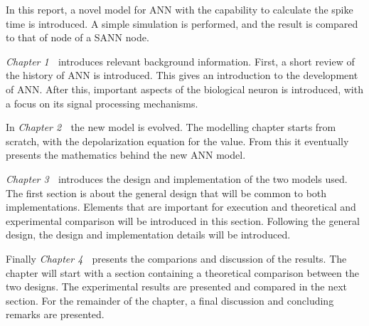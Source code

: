 In this report, a novel model for ANN with the capability to calculate the spike time is introduced.
A simple simulation is performed, and the result is compared to that of node of a SANN node.

\emph{Chapter 1} $\;$ introduces relevant background information. 
	First, a short review of the history of ANN is introduced. This gives an introduction to the development of ANN. After this, important aspects of the biological neuron is introduced, with a focus on its signal processing mechanisms.

In \emph{Chapter 2} $\;$ the new model is evolved. The modelling chapter starts from scratch, with the depolarization equation for the value. From this it eventually presents the mathematics behind the new ANN model.

\emph{Chapter 3} $\;$ introduces the design and implementation of the two models used. 
	The first section is about the general design that will be common to both implementations. Elements that are important for execution and  theoretical and experimental comparison will be introduced in this section.
	Following the general design, the design and implementation details will be introduced.

Finally \emph{Chapter 4} $\;$ presents the comparions and discussion of the results.
	The chapter will start with a section containing a theoretical comparison between the two designs.
	The experimental results are presented and compared in the next section.
	For the remainder of the chapter, a final discussion and concluding remarks are presented.





%
%
%
%





 



